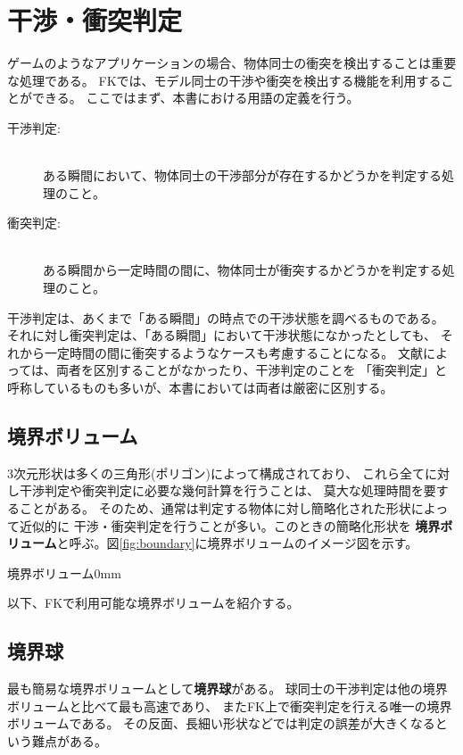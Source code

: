 \section{干渉・衝突判定}
ゲームのようなアプリケーションの場合、物体同士の衝突を検出することは重要な処理である。
FKでは、モデル同士の干渉や衝突を検出する機能を利用することができる。
ここではまず、本書における用語の定義を行う。
\begin{description}
 \item[干渉判定:] ~ \\
	ある瞬間において、物体同士の干渉部分が存在するかどうかを判定する処理のこと。

 \item[衝突判定:] ~ \\
	ある瞬間から一定時間の間に、物体同士が衝突するかどうかを判定する処理のこと。
\end{description}

干渉判定は、あくまで「ある瞬間」の時点での干渉状態を調べるものである。
それに対し衝突判定は、「ある瞬間」において干渉状態になかったとしても、
それから一定時間の間に衝突するようなケースも考慮することになる。
文献によっては、両者を区別することがなかったり、干渉判定のことを
「衝突判定」と呼称しているものも多いが、本書においては両者は厳密に区別する。

\subsection{境界ボリューム}
3次元形状は多くの三角形(ポリゴン)によって構成されており、
これら全てに対し干渉判定や衝突判定に必要な幾何計算を行うことは、
莫大な処理時間を要することがある。
そのため、通常は判定する物体に対し簡略化された形状によって近似的に
干渉・衝突判定を行うことが多い。このときの簡略化形状を
\textbf{境界ボリューム}と呼ぶ。図\ref{fig:boundary}に境界ボリュームのイメージ図を示す。

	{境界ボリューム}{0mm}

以下、FKで利用可能な境界ボリュームを紹介する。

\subsection{境界球}
最も簡易な境界ボリュームとして\textbf{境界球}がある。
球同士の干渉判定は他の境界ボリュームと比べて最も高速であり、
またFK上で衝突判定を行える唯一の境界ボリュームである。
その反面、長細い形状などでは判定の誤差が大きくなるという難点がある。

